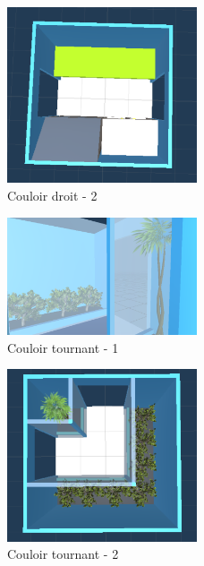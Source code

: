 \documentclass{article}
\begin{document}
\begin{figure}[!ht]
    \centering
    \includegraphics[width=0.5\textwidth]{Droit Haut.PNG}
    \caption{Couloir droit - 2}
    \label{Couloir droit - 2}
\end{figure}{}
\par\vspace{0.5cm}
\begin{figure}[!ht]
    \centering
    \includegraphics[width=0.5\textwidth]{Tournant Bas.PNG}
    \caption{Couloir tournant - 1}
    \label{Couloir tournant - 1}
\end{figure}{}
\par\vspace{0.5cm}
\begin{figure}[!ht]
    \centering
    \includegraphics[width=0.5\textwidth]{Tournant Haut.PNG}
    \caption{Couloir tournant - 2}
    \label{Couloir tournant - 2}
\end{figure}{}
\end{document}
